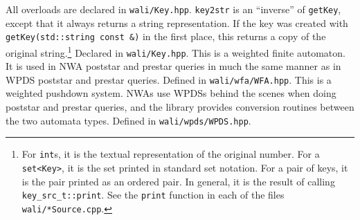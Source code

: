 \begin{functionlist}
    All overloads are declared in \texttt{wali/Key.hpp}.
   \texttt{key2str} is an ``inverse'' of \texttt{getKey}, except that it
    always returns a string representation. If the key was created with
    \texttt{getKey(std::string const \&)} in the first place, this
    returns a copy of the original string.\footnote{For \texttt{int}s, it is the
    textual representation of the original number. For a \texttt{set<Key>},
    it is the set printed in standard set notation. For a pair of keys, it is
    the pair printed as an ordered pair. In general, it is the result of
    calling \texttt{key\_src\_t::print}. See the \texttt{print} function in
    each of the files \texttt{wali/*Source.cpp}.} Declared in
    \texttt{wali/Key.hpp}.
   This is a weighted finite automaton. It is
    used in NWA poststar and prestar queries in much the same manner as in
    WPDS poststar and prestar queries. Defined in \texttt{wali/wfa/WFA.hpp}.
   This is a weighted pushdown system. NWAs use
    WPDSs behind the scenes when doing poststar and prestar queries, and the
    library provides conversion routines between the two automata
    types. Defined in \texttt{wali/wpds/WPDS.hpp}.
\end{functionlist}


